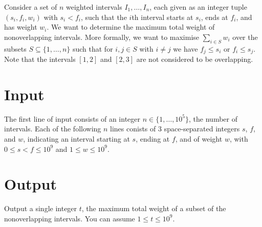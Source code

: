 

\noindent
Consider a set of $n$ weighted intervals $I_1,\ldots, I_n$, each given as an integer tuple $(s_i, f_i, w_i)$ with $s_i<f_i$, such that the $i$th interval starts at $s_i$, ends at $f_i$, and has weight $w_i$.
We want to determine the maximum total weight of nonoverlapping intervals.
More formally, we want to maximise $\sum_{i\in S} w_i$ over the subsets $S\subseteq \{1,\ldots,n\}$ such that for $i, j\in S$ with $i\neq j$ we have $f_j \leq s_i$ or $f_i\leq s_j$. 
Note that the intervals $[1,2]$ and $[2,3]$ are not considered to be overlapping.

\section*{Input}

The first line of input consists of an integer $n\in\{1,\ldots, 10^5\}$, the number of intervals.
Each of the following $n$ lines conists of 3 space-separated integers $s$, $f$, and $w$, indicating an interval starting at $s$, ending at $f$, and of weight $w$, with $0\leq s<f\leq 10^9$ and $1\leq w\leq 10^9$.


\section*{Output}

Output a single integer $t$, the maximum total weight of a subset of the nonoverlapping intervals.
You can assume  $1\leq t\leq 10^9$.
